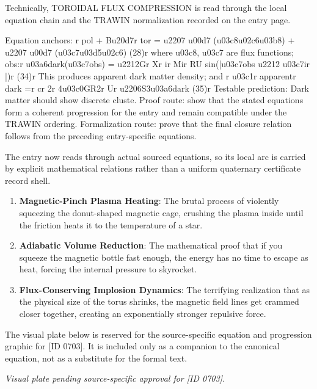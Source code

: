 Technically, TOROIDAL FLUX COMPRESSION is read through the local equation chain and the TRAWIN normalization recorded on the entry page.

Equation anchors: r pol + Bu20d7r tor = u2207 u00d7 (u03c8u02c6u03b8) + u2207 u00d7 (u03c7u03d5u02c6) (28)r where u03c8, u03c7 are flux functions; obs:r u03a6dark(u03c7obs) = u2212Gr Xr ir Mir RU sin(|u03c7obs u2212 u03c7ir |)r (34)r This produces apparent dark matter density; and r u03c1r apparentr dark =r cr 2r 4u03c0GR2r Ur u2206S3u03a6dark (35)r Testable prediction: Dark matter should show discrete cluste. Proof route: show that the stated equations form a coherent progression for the entry and remain compatible under the TRAWIN ordering. Formalization route: prove that the final closure relation follows from the preceding entry-specific equations.

The entry now reads through actual sourced equations, so its local arc is carried by explicit mathematical relations rather than a uniform quaternary certificate record shell.
\endgroup

\begin{enumerate}[leftmargin=1.6em,itemsep=6pt,topsep=4pt]
\item \textbf{Magnetic-Pinch Plasma Heating}: The brutal process of violently squeezing the donut-shaped magnetic cage, crushing the plasma inside until the friction heats it to the temperature of a star.
\item \textbf{Adiabatic Volume Reduction}: The mathematical proof that if you squeeze the magnetic bottle fast enough, the energy has no time to escape as heat, forcing the internal pressure to skyrocket.
\item \textbf{Flux-Conserving Implosion Dynamics}: The terrifying realization that as the physical size of the torus shrinks, the magnetic field lines get crammed closer together, creating an exponentially stronger repulsive force.
\end{enumerate}

\begingroup\footnotesize\sloppy
The visual plate below is reserved for the source-specific equation and progression graphic for [ID 0703]. It is included only as a companion to the canonical equation, not as a substitute for the formal text.
\par\endgroup
\begingroup\footnotesize\itshape
Visual plate pending source-specific approval for [ID 0703].
\par\endgroup

